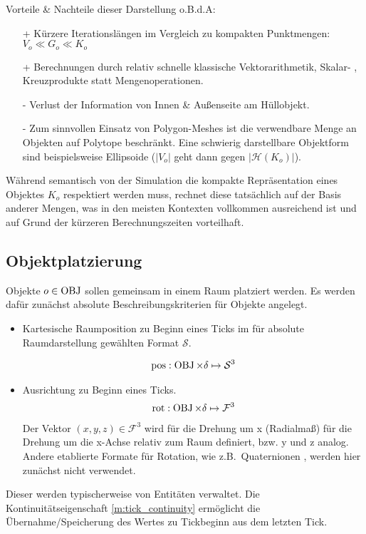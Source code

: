 Vorteile \& Nachteile dieser Darstellung o.B.d.A:
\begin{itemize}
\item [+]Kürzere Iterationslängen im Vergleich zu kompakten Punktmengen: $V_o \ll G_o \ll K_o$
\item [+]Berechnungen durch relativ schnelle klassische Vektorarithmetik, Skalar- , Kreuzprodukte statt Mengenoperationen.
\item [-]Verlust der Information von Innen \& Außenseite am Hüllobjekt.
\item [-]Zum sinnvollen Einsatz von Polygon-Meshes ist die verwendbare Menge an Objekten auf Polytope beschränkt. Eine schwierig darstellbare Objektform sind beispielsweise Ellipsoide ($|V_o|$ geht dann gegen $|\mathcal{H}(K_o)|$).
\end{itemize}

Während semantisch von der Simulation die kompakte Repräsentation eines Objektes $K_o$ respektiert werden muss, rechnet diese tatsächlich auf der Basis anderer Mengen, was in den meisten Kontexten vollkommen ausreichend ist und auf Grund der kürzeren Berechnungszeiten vorteilhaft.

\subsection{Objektplatzierung}
\label{sec:objects_sim}
\label{sec:object_sim}

Objekte $o\in \operatorname{OBJ}$ sollen gemeinsam in einem Raum platziert werden. 
Es werden dafür zunächst absolute Beschreibungskriterien für Objekte angelegt.
\begin{itemize}
\item Kartesische Raumposition zu Beginn eines Ticks im für absolute Raumdarstellung gewählten Format $\mathcal{S}$.

\begin{align}
	\operatorname{pos} : \operatorname{OBJ} \times \delta \mapsto \mathcal{S}^3
\end{align}
\item Ausrichtung zu Beginn eines Ticks.
\begin{align}
	\operatorname{rot} : \operatorname{OBJ} \times \delta \mapsto \mathcal{F}^3
\end{align}
Der Vektor $(x, y, z) \in\mathcal{F}^3$ wird für die Drehung um x (Radialmaß) für die Drehung um die x-Achse relativ zum Raum definiert, bzw. y und z analog. Andere etablierte Formate für Rotation, wie z.B.~Quaternionen \cite[p.80, 4.6]{fourcrossfour}, werden hier zunächst nicht verwendet.
\end{itemize}
Dieser werden typischerweise von Entitäten verwaltet.
Die Kontinuitätseigenschaft \ref{m:tick_continuity} ermöglicht die Übernahme/Speicherung des Wertes zu Tickbeginn aus dem letzten Tick.

